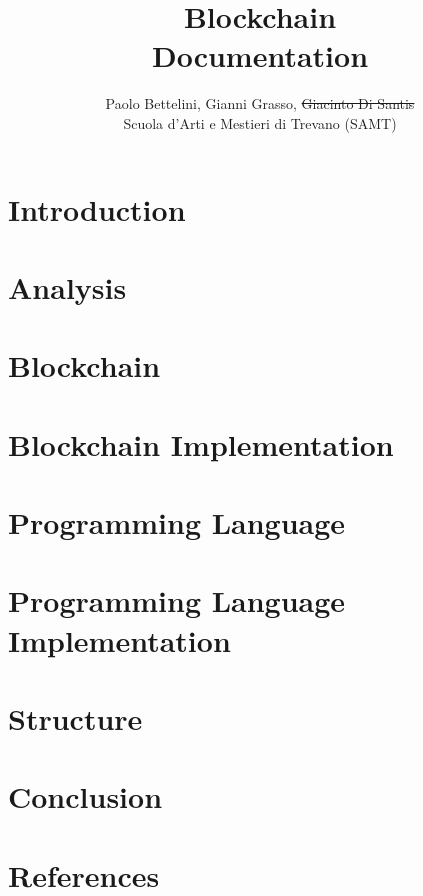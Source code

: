 \documentclass{article}
\title{
    Blockchain \\
    \large Documentation}
\author{
    Paolo Bettelini, Gianni Grasso, \sout{Giacinto Di Santis} \\
    \large Scuola d'Arti e Mestieri di Trevano (SAMT)}
\date{}
\begin{document}
\maketitle

\pagebreak

\tableofcontents

\pagebreak

\section{Introduction}



\pagebreak

\section{Analysis}



\pagebreak

\section{Blockchain}



\pagebreak

\section{Blockchain Implementation}



\pagebreak

\section{Programming Language}



\pagebreak

\section{Programming Language Implementation}



\pagebreak

\section{Structure}



\pagebreak

\section{Conclusion}



\pagebreak

\section{References}

\nocite{*} %


\printbibliography[type=online, heading=subbibliography, title=Sitography]
\end{document}

